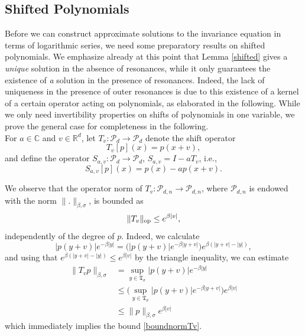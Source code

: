 \documentclass{amsart}
\theoremstyle{plain}
\theoremstyle{definition}
\begin{document}
\subsection{Shifted Polynomials}

Before we can construct approximate solutions to the invariance equation in terms of logarithmic series, we need some preparatory results on shifted polynomials. We emphasize already at this point that Lemma \ref{shifted} gives a \emph{unique} solution in the absence of resonances, while it only guarantees the existence of \emph{a} solution in the presence of resonances. Indeed, the lack of uniqueness in the presence of outer resonances is due to this existence of a kernel of a certain operator acting on polynomials, as elaborated in the following. While we only need invertibility properties on shifts of polynomials in one variable, we prove the general case for completeness in the following. \\

For $a\in\mathbb{C}$ and $v\in\mathbb{R}^d$, let $T_v:\mathcal{P}_d\to\mathcal{P}_d$ denote the shift operator
\begin{equation}\label{def_shift_v}
    T_v[p](x)=p(x+v),
\end{equation}
and define the operator $S_{a,v}:\mathcal{P}_d\to\mathcal{P}_d$, $S_{a,v}=I-aT_v$, i.e.,
\begin{equation}\label{defSav}
    S_{a,v}[p](x) = p(x)- a p(x+v). 
\end{equation}



We observe that the operator norm of $T_v:\mathcal{P}_{d,n}\to\mathcal{P}_{d,n}$, where $\mathcal{P}_{d,n}$ is endowed with the norm $\|.\|_{\beta,\sigma}$, is bounded as 
\begin{equation}\label{boundnormTv}
    \|T_v\|_{\rm op} \leq e^{\beta |v|},
\end{equation}
independently of the degree of $p$. Indeed, we calculate
\begin{equation}
    |p(y+v)|e^{-\beta |y|} = \Big( |p(y+v)|e^{-\beta |y+v|} \Big)e^{\beta (|y+v|-|y|)},
\end{equation}
and using that $e^{\beta (|y+v|-|y|)}\leq e^{\beta |v|}$ by the triangle inequality, we can estimate
\begin{equation}
    \begin{split}
        \|T_v p\|_{\beta,\sigma} & = \sup_{y\in\mathfrak{T}_\sigma}  |p(y+v)|e^{-\beta |y|}\\
        & \leq \Big(\sup_{y\in\mathfrak{T}_\sigma}  |p(y+v)|e^{-\beta |y+v|}\Big) e^{\beta |v|}\\
        & \leq \|p\|_{\beta,\sigma} e^{\beta|v|}
    \end{split}
\end{equation}
which immediately implies the bound \eqref{boundnormTv}. 
\end{document}
